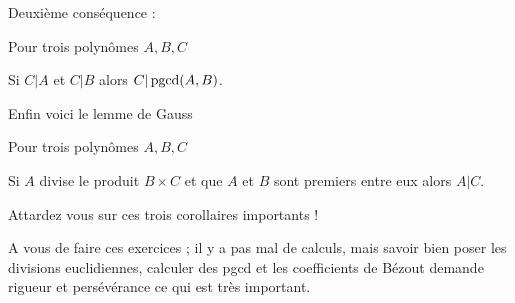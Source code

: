 \change

Deuxième conséquence :

Pour trois polynômes $A,B,C$

Si $C|A$ et $C|B$ alors $C|\mathop{\mathrm{pgcd}}\nolimits(A,B)$.

\change

Enfin voici le lemme de Gauss

Pour trois polynômes $A,B,C$

Si $A$ divise le produit $B \times C$ et que $A$ et $B$ sont premiers entre eux alors $A|C$.

Attardez vous sur ces trois corollaires importants !

\diapo

A vous de faire ces exercices ; il y a pas mal de calculs, mais savoir
bien poser les divisions euclidiennes, calculer des pgcd et les coefficients de Bézout
demande rigueur et persévérance ce qui est très important.


